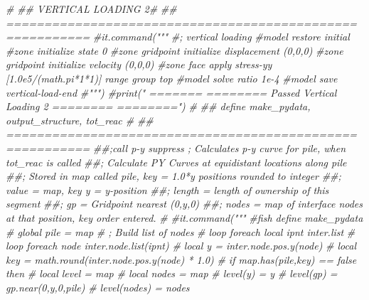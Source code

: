 \documentclass[a4paper, nobind]{templates/ociamthesis}
\newenvironment{Shaded}{\begin{snugshade}}{\end{snugshade}}
\newcommand{\CommentTok}[1]{\textcolor[rgb]{0.56,0.35,0.01}{\textit{#1}}}
\renewenvironment{Shaded}
{
  \vspace{10pt}%
  \begin{snugshade}%
}{%
  \end{snugshade}%
  \vspace{8pt}%
}
\begin{document}
\begin{Shaded}
\begin{Highlighting}[]
\CommentTok{\#}
\CommentTok{\#\# VERTICAL LOADING 2\#}
\CommentTok{\#\# =========================================================}
\CommentTok{\#it.command("""}
\CommentTok{\#; vertical loading}
\CommentTok{\#model restore \textquotesingle{}initial\textquotesingle{}}
\CommentTok{\#zone initialize state 0}
\CommentTok{\#zone gridpoint initialize displacement (0,0,0)}
\CommentTok{\#zone gridpoint initialize velocity     (0,0,0)}
\CommentTok{\#zone face apply stress{-}yy [1.0e5/(math.pi*1*1)] range group \textquotesingle{}top\textquotesingle{}}
\CommentTok{\#model solve ratio 1e{-}4}
\CommentTok{\#model save \textquotesingle{}vertical{-}load{-}end\textquotesingle{}}
\CommentTok{\#""")}
\CommentTok{\#print("               =======        ======== Passed Vertical Loading 2 ========        ========")}
\CommentTok{\#}
\CommentTok{\#\# define make\_pydata, output\_structure, tot\_reac \#}
\CommentTok{\#\# =========================================================}
\CommentTok{\#\#;call \textquotesingle{}p{-}y\textquotesingle{} suppress ; Calculates p{-}y curve for pile, when tot\_reac is called}
\CommentTok{\#\#; Calculate PY Curves at equidistant locations along pile}
\CommentTok{\#\#; Stored in map called pile, key = 1.0*y positions rounded to integer}
\CommentTok{\#\#;    value = map, key \textquotesingle{}y\textquotesingle{} = y{-}position}
\CommentTok{\#\#;                     \textquotesingle{}length\textquotesingle{} = length of ownership of this segment}
\CommentTok{\#\#;                     \textquotesingle{}gp\textquotesingle{} = Gridpoint nearest (0,y,0)}
\CommentTok{\#\#;                     \textquotesingle{}nodes\textquotesingle{} = map of interface nodes at that position, key order entered.}
\CommentTok{\#}
\CommentTok{\#it.command("""}
\CommentTok{\#fish define make\_pydata}
\CommentTok{\#    global pile = map}
\CommentTok{\#    ; Build list of nodes}
\CommentTok{\#    loop foreach local ipnt inter.list}
\CommentTok{\#        loop foreach node inter.node.list(ipnt)}
\CommentTok{\#            local y = inter.node.pos.y(node)}
\CommentTok{\#            local key = math.round(inter.node.pos.y(node) * 1.0)}
\CommentTok{\#            if map.has(pile,key) == false then}
\CommentTok{\#                local level = map}
\CommentTok{\#                local nodes = map}
\CommentTok{\#                level(\textquotesingle{}y\textquotesingle{}) = y}
\CommentTok{\#                level(\textquotesingle{}gp\textquotesingle{}) = gp.near(0,y,0,\textquotesingle{}pile\textquotesingle{})}
\CommentTok{\#                level(\textquotesingle{}nodes\textquotesingle{}) = nodes}

\end{Highlighting}
\end{Shaded}
\end{document}
